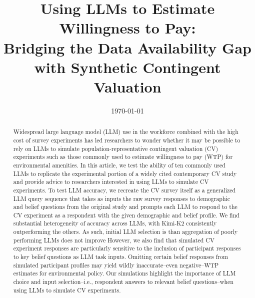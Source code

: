 \documentclass[12pt]{article}
\title{Using LLMs to Estimate Willingness to Pay: \\ Bridging the Data Availability Gap with Synthetic Contingent Valuation}
\date{\today}
\author{}
\begin{document}
\maketitle


\footnotesize
\begin{abstract}
Widespread large language model (LLM) use in the workforce combined with the high cost of survey experiments has led researchers to wonder whether it may be possible to rely on LLMs to simulate population-representative contingent valuation (CV) experiments such as those commonly used to estimate willingness to pay (WTP) for environmental amenities. In this article, we test the ability of ten commonly used LLMs to replicate the experimental portion of a widely cited contemporary CV study and provide advice to researchers interested in using LLMs to simulate CV experiments. To test LLM accuracy, we recreate the CV survey itself as a generalized LLM query sequence that takes as inputs the raw survey responses to demographic and belief questions from the original study and prompts each LLM to respond to the CV experiment as a respondent with the given demographic and belief profile. We find substantial heterogeneity of accuracy across LLMs, with Kimi-K2 consistently outperforming the others. As such, initial LLM selection is  than aggregation of poorly performing LLMs does not improve However, we also find that simulated CV experiment responses are particularly sensitive to the inclusion of participant responses to key belief questions as LLM task inputs. Omitting certain belief responses from simulated participant profiles may yield wildly inaccurate--even negative--WTP estimates for environmental policy. Our simulations highlight the importance of LLM choice and input selection--i.e., respondent answers to relevant belief questions--when using LLMs to simulate CV experiments.
\end{abstract}

\newpage
\end{document}
